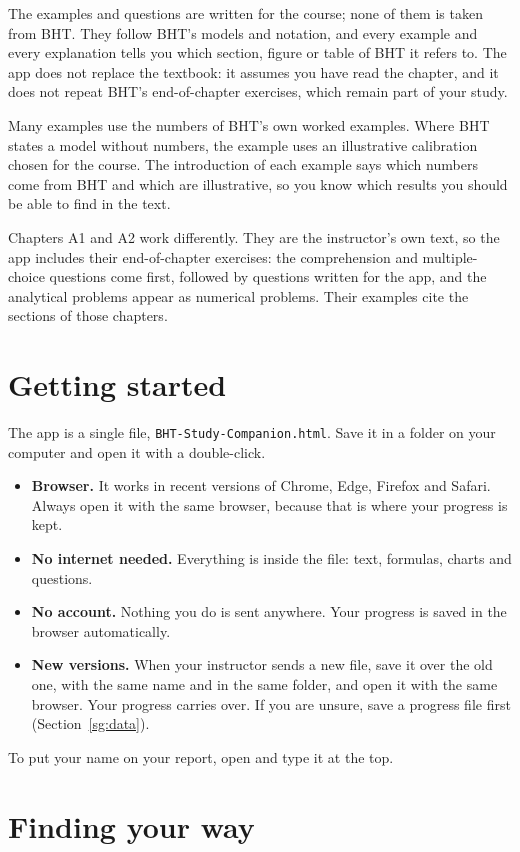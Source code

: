 The examples and questions are written for the course; none of them is taken from BHT. They follow BHT's models and notation, and every example and every explanation tells you which section, figure or table of BHT it refers to. The app does not replace the textbook: it assumes you have read the chapter, and it does not repeat BHT's end-of-chapter exercises, which remain part of your study.

Many examples use the numbers of BHT's own worked examples. Where BHT states a model without numbers, the example uses an illustrative calibration chosen for the course. The introduction of each example says which numbers come from BHT and which are illustrative, so you know which results you should be able to find in the text.

Chapters A1 and A2 work differently. They are the instructor's own text, so the app includes their end-of-chapter exercises: the comprehension and multiple-choice questions come first, followed by questions written for the app, and the analytical problems appear as numerical problems. Their examples cite the sections of those chapters.

\section{Getting started}

The app is a single file, \texttt{BHT-Study-Companion.html}. Save it in a folder on your computer and open it with a double-click.
\begin{itemize}
  \item \textbf{Browser.} It works in recent versions of Chrome, Edge, Firefox and Safari. Always open it with the same browser, because that is where your progress is kept.
  \item \textbf{No internet needed.} Everything is inside the file: text, formulas, charts and questions.
  \item \textbf{No account.} Nothing you do is sent anywhere. Your progress is saved in the browser automatically.
  \item \textbf{New versions.} When your instructor sends a new file, save it over the old one, with the same name and in the same folder, and open it with the same browser. Your progress carries over. If you are unsure, save a progress file first (Section~\ref{sg:data}).
\end{itemize}
To put your name on your report, open  and type it at the top.

\section{Finding your way}

